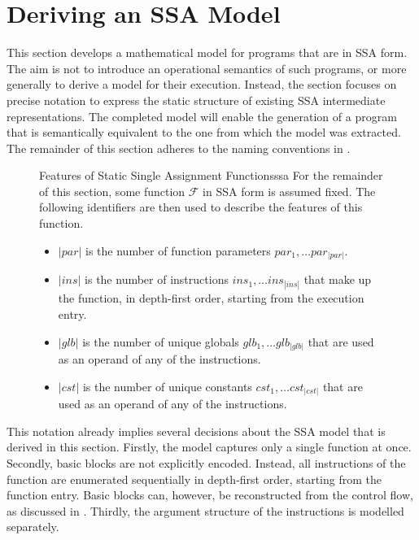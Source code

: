 \section{Deriving an SSA Model}
\label{sec:derivingamodel}

    This section develops a mathematical model for programs that are in
    SSA form.
    The aim is not to introduce an operational semantics of such programs, or
    more generally to derive a model for their execution.
    Instead, the section focuses on precise notation to express the static
    structure of existing SSA intermediate representations.
    The completed model will enable the generation of a program that is
    semantically equivalent to the one from which the model was extracted.
    The remainder of this section adheres to the naming conventions in
    .

\begin{figure}[h]
\begin{definition}{Features of Static Single Assignment Functions}{ssa}
    For the remainder of this section, some function $\mathcal F$ in SSA form is
    assumed fixed. 
    The following identifiers are then used to describe the features of this
    function.

    \begin{itemize}
    \item $|par|$ is the number of function parameters
          $par_1,\dots par_{|par|}$.
    \item $|ins|$ is the number of instructions $ins_1,\dots ins_{|ins|}$ that
          make up the function, in depth-first order, starting from the
          execution entry.
    \item $|glb|$ is the number of unique globals $glb_1,\dots glb_{|glb|}$ that
          are used as an operand of any of the instructions.
    \item $|cst|$ is the number of unique constants $cst_1,\dots cst_{|cst|}$
          that are used as an operand of any of the instructions.
    \end{itemize}
\end{definition}
\end{figure}

    This notation already implies several decisions about the SSA model that is
    derived in this section.
    Firstly, the model captures only a single function at once.
    Secondly, basic blocks are not explicitly encoded.
    Instead, all instructions of the function are enumerated sequentially in
    depth-first order, starting from the function entry.
    Basic blocks can, however, be reconstructed from the control flow, as
    discussed in .
    Thirdly, the argument structure of the instructions is modelled separately.

